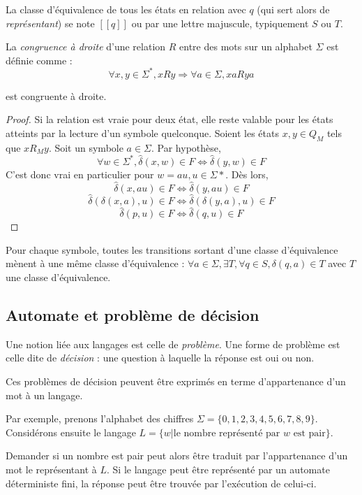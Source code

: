 	 La classe d'équivalence de tous les états en relation \rm avec $q$ (qui sert alors de \emph{représentant}) se note $[[q]]$ ou par une lettre majuscule, typiquement $S$ ou $T$.
	 
	 La \emph{congruence à droite} d'une relation $R$ entre des mots sur un alphabet $\Sigma$ est définie comme :
	 $$
	 \forall x,y \in \Sigma^*, xRy \Rightarrow \forall a \in \Sigma, xaRya 
	 $$  
	 
	 \begin{proposition}
	 	\rm est congruente à droite.
	 \end{proposition}
	 
	 \begin{proof}
	 	Si la relation est vraie pour deux état, elle reste valable pour les états atteints par la lecture d'un symbole quelconque. Soient les états $x,y \in Q_M$ tels que $xR_My$. Soit un symbole $a \in \Sigma$. Par hypothèse, 
	 	$$\forall w \in \Sigma^*, \hat{\delta}(x, w) \in F \iff \hat{\delta}(y, w) \in F$$
	 	C'est donc vrai en particulier pour $w = au, u \in \Sigma*$. Dès lors,
	 	$$\hat{\delta}(x, au) \in F\iff \hat{\delta}(y, au)\in F$$
	 	$$\hat{\delta}(\delta(x,a),u) \in F\iff\hat{\delta}(\delta(y,a),u)\in F$$
	 	$$\hat{\delta}(p,u) \in F\iff \hat{\delta}(q,u)\in F$$
	 \end{proof}
 
 	\begin{corollary}
 		Pour chaque symbole, toutes les transitions sortant d'une classe d'équivalence mènent à une même classe d'équivalence :
 		$\forall a \in \Sigma, \exists T, \forall q \in S, \delta(q,a)\in T$ avec $T$ une classe d'équivalence.
 	\end{corollary}
	 
	 
	 \subsection{Automate et problème de décision}
	 
	 Une notion liée aux langages est celle de \emph{problème}. Une forme de problème est celle dite de \emph{décision} : une question à laquelle la réponse est oui ou non.
	 
	 Ces problèmes de décision peuvent être exprimés en terme d'appartenance d'un mot à un langage.
	 
	 Par exemple, prenons l'alphabet des chiffres $\Sigma=\{0,1,2,3,4,5,6,7,8,9\}$. Considérons ensuite le langage $L = \{w | \text{le nombre représenté par } w \text{ est pair}\}$.
	 
	 Demander si un nombre est pair peut alors être traduit par l'appartenance d'un mot le représentant à $L$. Si le langage peut être représenté par un automate déterministe fini, la réponse peut être trouvée par l'exécution de celui-ci.
	 
	 
	 
	 